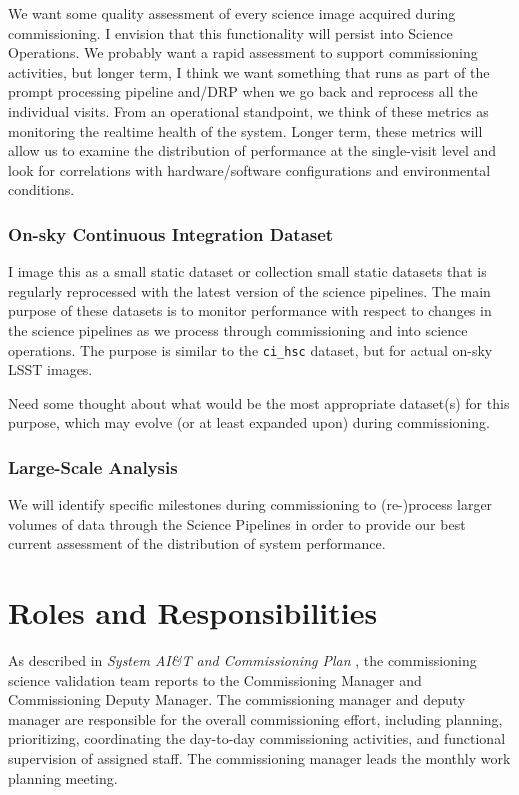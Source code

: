 \documentclass[DM,lsstdraft,toc]{lsstdoc}
\begin{document}
We want some quality assessment of every science image acquired during commissioning. 
I envision that this functionality will persist into Science Operations.
We probably want a rapid assessment to support commissioning activities, but longer term, I think we want something that runs as part of the prompt processing pipeline and/DRP when we go back and reprocess all the individual visits.
From an operational standpoint, we think of these metrics as monitoring the realtime health of the system. 
Longer term, these metrics will allow us to examine the distribution of performance at the single-visit level and look for correlations with hardware/software configurations and environmental conditions.

\subsubsection{On-sky Continuous Integration Dataset}

I image this as a small static dataset or collection small static datasets that is regularly reprocessed with the latest version of the science pipelines.
The main purpose of these datasets is to monitor performance with respect to changes in the science pipelines as we process through commissioning and into science operations. 
The purpose is similar to the \texttt{ci\_hsc} dataset, but for actual on-sky LSST images.

Need some thought about what would be the most appropriate dataset(s) for this purpose, which may evolve (or at least expanded upon) during commissioning.

\subsubsection{Large-Scale Analysis}

We will identify specific milestones during commissioning to (re-)process larger volumes of data through the Science Pipelines in order to provide our best current assessment of the distribution of system performance.

\section{Roles and Responsibilities}

As described in \emph{System AI\&T and Commissioning Plan} , the commissioning science validation team reports to the Commissioning Manager and Commissioning Deputy Manager.
The commissioning manager and deputy manager are responsible for the overall commissioning effort, including planning, prioritizing, coordinating the day-to-day commissioning activities, and functional supervision of assigned staff.
The commissioning manager leads the monthly work planning meeting.
\end{document}
